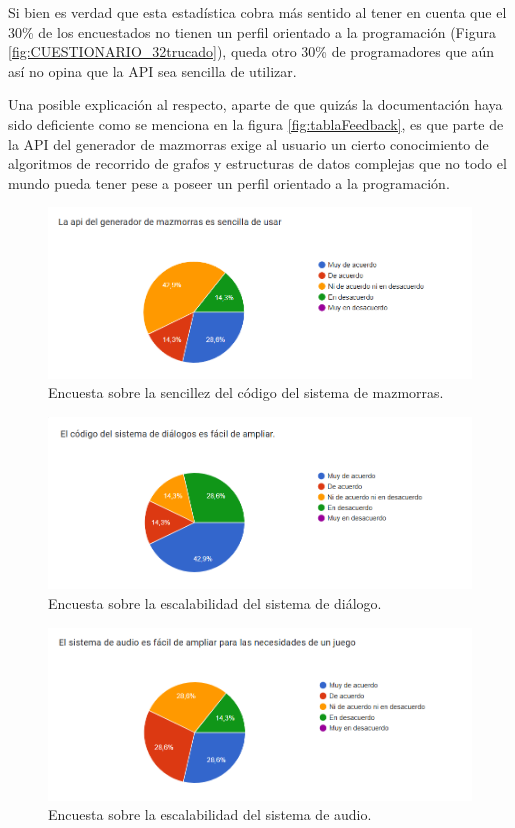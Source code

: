   Si bien es verdad que esta estadística cobra más sentido al tener en cuenta que el 30\% de los encuestados no tienen un perfil orientado a
   la programación (Figura \ref{fig:CUESTIONARIO_32trucado}), queda otro 30\% de programadores que aún así no opina que la API sea sencilla de utilizar. 
   
   Una posible explicación al respecto, aparte de que quizás la
   documentación haya sido deficiente como se menciona en la figura \ref{fig:tablaFeedback}, es que parte de la API del generador de mazmorras exige al usuario un cierto
    conocimiento de algoritmos de recorrido de grafos y estructuras de datos complejas que no todo el mundo pueda tener pese a poseer un perfil orientado a la programación. 

\begin{figure}[H]
  \centering
  \includegraphics[width=450px,clip=true]{CUESTIONARIO_15.png}
  \caption{Encuesta sobre la sencillez del código del sistema de mazmorras.}
  \label{fig:CUESTIONARIO_15trucado}
\end{figure}
\raggedbottom

\begin{figure}[H]
  \centering
  \includegraphics[width=450px,clip=true]{CUESTIONARIO_3.png}
  \caption{Encuesta sobre la escalabilidad del sistema de diálogo.}
  \label{fig:CUESTIONARIO_3trucado}
\end{figure}
\raggedbottom

\begin{figure}[H]
  \centering
  \includegraphics[width=450px,clip=true]{CUESTIONARIO_6.png}
  \caption{Encuesta sobre la escalabilidad del sistema de audio.}
  \label{fig:CUESTIONARIO_6trucado}
\end{figure}
\raggedbottom

